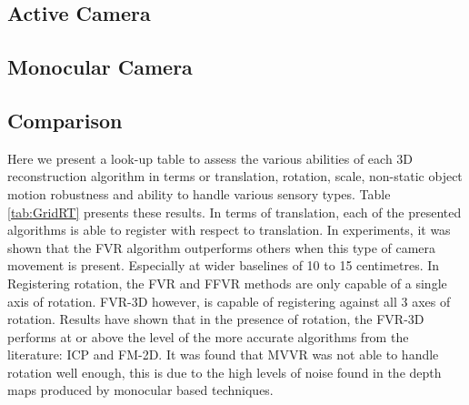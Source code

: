 \subsection{Active Camera}
\label{ActiveSOTA}


\subsection{Monocular Camera}
\label{Sec:MonocularSOTA}




\subsection{Comparison}

\begin{table}
\label{tab:GridRT}
\caption{FVR Comparison Table}
\end{table}


Here we present a look-up table to assess the various abilities of each 3D reconstruction algorithm in terms or translation, rotation, scale, non-static object motion robustness and ability to handle various sensory types. Table \ref{tab:GridRT} presents these results. In terms of translation, each of the presented algorithms is able to register with respect to translation. In experiments, it was shown that the FVR algorithm outperforms others when this type of camera movement is present. Especially at wider baselines of 10 to 15 centimetres. In Registering rotation, the FVR and FFVR methods are only capable of a single axis of rotation. FVR-3D however, is capable of registering against all 3 axes of rotation. Results have shown that in the presence of rotation, the FVR-3D performs at or above the level of the more accurate algorithms from the literature: ICP and FM-2D. It was found that MVVR was not able to handle rotation well enough, this is due to the high levels of noise found in the depth maps produced by monocular based techniques. \\

